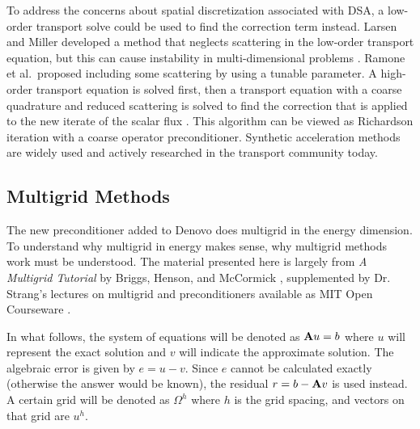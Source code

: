 To address the concerns about spatial discretization associated with DSA, a low-order transport solve could be used to find the correction term instead. Larsen and Miller developed a method that neglects scattering in the low-order transport equation, but this can cause instability in multi-dimensional problems \cite{Larsen1986}. Ramone et al.\ proposed including some scattering by using a tunable parameter. A high-order transport equation is solved first, then a transport equation with a coarse quadrature and reduced scattering is solved to find the correction that is applied to the new iterate of the scalar flux \cite{Ramone1997}. This algorithm can be viewed as Richardson iteration with a coarse operator preconditioner. Synthetic acceleration methods are widely used and actively researched in the transport community today.

\subsection{Multigrid Methods}
The new preconditioner added to Denovo does multigrid in the energy dimension. To understand why multigrid in energy makes sense, why multigrid methods work must be understood. The material presented here is largely from \emph{A Multigrid Tutorial} by Briggs, Henson, and McCormick \cite{Briggs2000}, supplemented by Dr. Strang's lectures on multigrid and preconditioners available as MIT Open Courseware \cite{Strang}.

In what follows, the system of equations will be denoted as $\mathbf{A}u=b$ where $u$ will represent the exact solution and $v$ will indicate the approximate solution. The algebraic error is given by $e = u - v$. Since $e$ cannot be calculated exactly (otherwise the answer would be known), the residual $r = b - \mathbf{A}v$ is used instead. A certain grid will be denoted as $\Omega^{h}$ where $h$ is the grid spacing, and vectors on that grid are $u^{h}$. 

